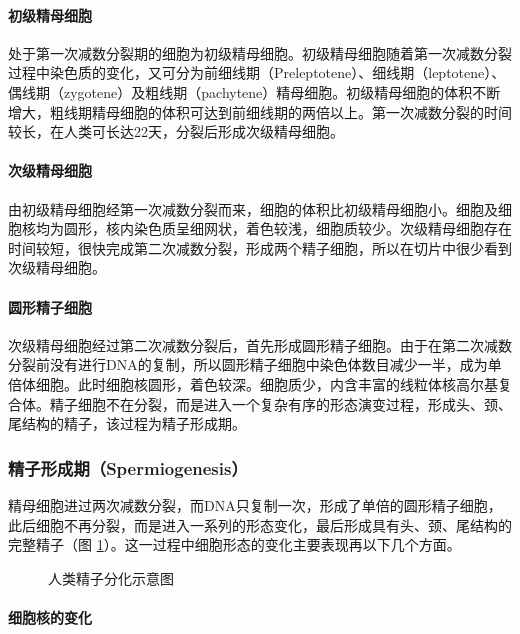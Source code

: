 \paragraph{初级精母细胞}

处于第一次减数分裂期的细胞为初级精母细胞。初级精母细胞随着第一次减数分裂过程中染色质的变化，又可分为前细线期（Preleptotene）、细线期（leptotene）、偶线期（zygotene）及粗线期（pachytene）精母细胞。初级精母细胞的体积不断增大，粗线期精母细胞的体积可达到前细线期的两倍以上。第一次减数分裂的时间较长，在人类可长达22天，分裂后形成次级精母细胞。

\paragraph{次级精母细胞}

由初级精母细胞经第一次减数分裂而来，细胞的体积比初级精母细胞小。细胞及细胞核均为圆形，核内染色质呈细网状，着色较浅，细胞质较少。次级精母细胞存在时间较短，很快完成第二次减数分裂，形成两个精子细胞，所以在切片中很少看到次级精母细胞。

\paragraph{圆形精子细胞}

次级精母细胞经过第二次减数分裂后，首先形成圆形精子细胞。由于在第二次减数分裂前没有进行DNA的复制，所以圆形精子细胞中染色体数目减少一半，成为单倍体细胞。此时细胞核圆形，着色较深。细胞质少，内含丰富的线粒体核高尔基复合体。精子细胞不在分裂，而是进入一个复杂有序的形态演变过程，形成头、颈、尾结构的精子，该过程为精子形成期。

\subsubsection{精子形成期（Spermiogenesis）}

精母细胞进过两次减数分裂，而DNA只复制一次，形成了单倍的圆形精子细胞，此后细胞不再分裂，而是进入一系列的形态变化，最后形成具有头、颈、尾结构的完整精子（图 \ref{图-人类精子分化示意图}）。这一过程中细胞形态的变化主要表现再以下几个方面。

\begin{figure}[H]
\centering
\myFigurePlaceholder
\caption{人类精子分化示意图}
\label{图-人类精子分化示意图}
\end{figure}

\paragraph{细胞核的变化}

